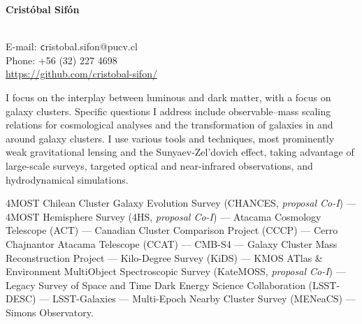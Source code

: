 \documentclass[11pt]{article}
\begin{document}
\begin{minipage}[b]{0.46\linewidth}
\flushleft
\hspace{-0.7cm}
{\bf\huge Crist\'obal Sif\'on}\\\vspace{0.2cm}
\\
\end{minipage}
\begin{minipage}[b]{0.49\linewidth}
\flushright
{\large E-mail: {\texttt cristobal.sifon@pucv.cl}\\
        Phone: +56 (32) 227 4698\\
        \url{https://github.com/cristobal-sifon/}}
\end{minipage}
\vspace{0.4cm}
\hline




I focus on the interplay between luminous and dark matter, with a focus on galaxy clusters. Specific questions I address include observable--mass scaling relations for cosmological analyses and the transformation of galaxies in and around galaxy clusters. I use various tools and techniques, most prominently weak gravitational lensing and the Sunyaev-Zel'dovich effect, taking advantage of large-scale surveys, targeted optical and near-infrared observations, and hydrodynamical simulations.

\vspace{0.5cm}
{
 4MOST Chilean Cluster Galaxy Evolution Survey (CHANCES, \textit{proposal Co-I}) ---
 4MOST Hemisphere Survey (4HS, \textit{proposal Co-I}) ---
 Atacama Cosmology Telescope (ACT) ---
 Canadian Cluster Comparison Project (CCCP) ---
 Cerro Chajnantor Atacama Telescope (CCAT) ---
 CMB-S4 ---
 Galaxy Cluster Mass Reconstruction Project ---
 Kilo-Degree Survey (KiDS) ---
 KMOS ATlas & Environment MultiObject Spectroscopic Survey (KateMOSS, \textit{proposal Co-I}) ---
 Legacy Survey of Space and Time Dark Energy Science Collaboration (LSST-DESC) ---
 LSST-Galaxies ---
 Multi-Epoch Nearby Cluster Survey (MENeaCS) ---
 Simons Observatory.
}
\end{document}
